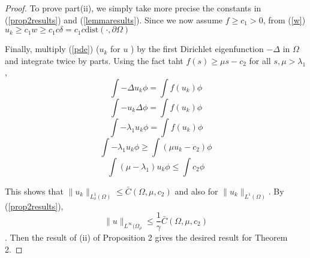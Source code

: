 \documentclass[paper=a4, fontsize=11pt]{scrartcl} %
\numberwithin{equation}{section} %
\numberwithin{figure}{section} %
\numberwithin{table}{section} %
\numberwithin{exercise}{section}
\begin{document}
\begin{proof}
To prove part(ii), we simply take more precise the constants in (\ref{prop2results}) and (\ref{lemmaresults}). Since we now assume $f\geq c_1>0$,  from (\ref{w}) $u_k\geq c_1 w \geq c_1 c\delta=c_1 c\mathrm{dist} (\cdot,\partial\Omega)$

Finally, multiply (\ref{pde}) ($u_k$ for $u$ ) by the first Dirichlet eigenfunction $-\Delta$ in $\Omega$ and integrate twice by parts. Using the fact taht $f(s)\geq \mu s-c_2$ for all $s, \mu >\lambda_1$,
$$\int -\Delta u_k \phi =\int f(u_k) \phi$$
$$\int -u_k\Delta \phi =\int f(u_k) \phi$$
$$\int -\lambda_1 u_k\phi =\int f(u_k) \phi$$
$$\int -\lambda_1 u_k\phi \geq\int (\mu u_k-c_2) \phi$$
$$\int (\mu -\lambda_1) u_k\phi \leq\int c_2 \phi$$

This shows that $\|u_k\|_{L_{\delta}^{1}(\Omega)} \leq \bar{C}(\Omega,\mu,c_2)$ and also for $\|u_k\|_{L^1(\Omega)}$. By (\ref{prop2results}),
$$\|u\|_{L^\infty(\Omega_{\rho}} \leq \frac{1}{\gamma} \bar{C}(\Omega,\mu,c_2)$$.
Then the result of (ii) of Proposition 2 gives the desired result for Theorem 2.
\end{proof}
\end{document}
